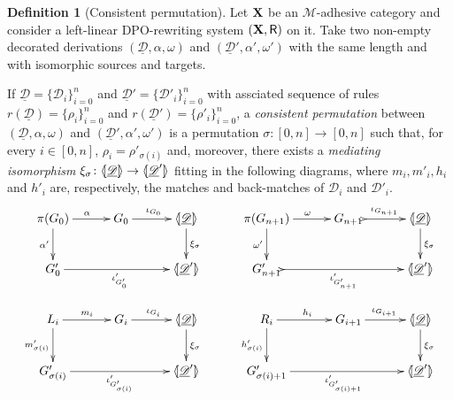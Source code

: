 \documentclass[a4paper]{article}
\def\R{\mathsf{R}}
\def\X{\textbf {\textup{X}}}
\newcommand{\dder}[1]{\mathscr{#1}}
\newcommand{\der}[1]{\underline{\dder{#1}}}
\newcommand{\lpro}{\langle \hspace{-1.85pt}[}
\newcommand{\rpro}{]\hspace{-1.85pt}\rangle}
\newcommand{\tpro}[1]{\lpro \der{#1}\rpro}
\theoremstyle{definition}
\newtheorem{definition}[theorem]{Definition}
\begin{document}
\begin{definition}[Consistent permutation]\label{def:permcon}
	Let $\X$ be an $\mathcal{M}$-adhesive category and consider a left-linear DPO-rewriting system $(\X, \R)$ on it.  Take two non-empty decorated derivations $(\der{D}, \alpha, \omega)$ and  $(\der{D}', \alpha', \omega')$ with the same length and with isomorphic sources and targets.
	 	 
	 	If $\der{D}=\{\dder{D}_i\}_{i=0}^n$ and $\der{D}'=\{\dder{D}'_i\}_{i=0}^n$ with assciated sequence of rules $r(\der{D})=\{\rho_i\}_{i=0}^n$ and $r(\der{D}')=\{\rho'_i\}_{i=0}^n$, a \emph{consistent permutation} between  $(\der{D}, \alpha, \omega)$ and $(\der{D}', \alpha', \omega')$ is a permutation $\sigma\colon [0,n]\to [0,n]$  such that, for every $i\in [0,n]$, $\rho_i=\rho'_{\sigma(i)}$ and, moreover, there exists a \emph{mediating isomorphism} $\xi_\sigma\colon \tpro{D} \to \lpro \der{D}' \rpro$ fitting in the following diagrams, where $m_i, m'_i, h_i$ and $h'_i$ are, respectively, the matches and back-matches of $\dder{D}_i$ and $\dder{D}'_i$.
	\[\xymatrix@C=30pt{\pi(G_0)\ar[r]^{\alpha} \ar[d]_{\alpha'} & G_0 \ar[r]^{\iota_{G_0}} &\tpro{D} \ar[d]^{\xi_\sigma}&   \pi(G_{n+1}) \ar[r]^{\omega} \ar[d]_{\omega'} & G_{n+1} \ar@{>->}[r]^{\iota_{G_{n+1}}} &\tpro{D} \ar[d]^{\xi_\sigma}\\ G'_0 \ar[rr]_{\iota'_{G'_0}} & &\lpro \der{D}' \rpro& G'_{n+1} \ar@{>->}[rr]_{\iota'_{G'_{n+1}}} & &\lpro \der{D}' \rpro\\L_i \ar[r]^{m_i} \ar[d]_{m'_{\sigma(i)}}& G_i \ar[r]^{\iota_{G_i}} &\tpro{D} \ar[d]^{\xi_\sigma} & R_i \ar[r]^{h_i} \ar[d]_{h'_{\sigma(i)}}& G_{i+1} \ar[r]^{\iota_{G_{i+1}}} &\tpro{D} \ar[d]^{\xi_\sigma} \\G'_{\sigma(i)} \ar[rr]_{\iota'_{G'_{\sigma(i)}}}&& \lpro \der{D}' \rpro& G'_{\sigma(i)+1} \ar[rr]_{\iota'_{G'_{\sigma(i)+1}}}&& \lpro \der{D}' \rpro}\]
\end{definition}
\end{document}
